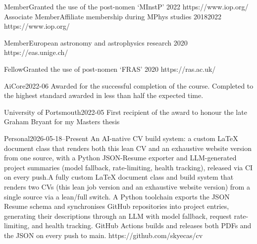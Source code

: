 {Member}{Granted the use of the post-nomen `MInstP'}
{2022}{}
{}
{https://www.iop.org/}
\iflean\else
{}
{Associate Member}{Affiliate membership during MPhys studies}
{2018}{2022}
{}
{https://www.iop.org/}

{Member}{European astronomy and astrophysics research}
{2020}{}
{}
{https://eas.unige.ch/}
\fi

{Fellow}{Granted the use of post-nomen `FRAS'}
{2020}{}
{}
{https://ras.ac.uk/}


{AiCore}{2022-06}
{Awarded for the successful completion of the course. Completed to the highest standard awarded in less than half the expected time.}

{University of Portsmouth}{2022-05}
{First recipient of the award to honour the late Graham Bryant for my Masters thesis}



{Personal}{2026-05-18--Present}
{\iflean An AI-native CV build system: a custom LaTeX document class that renders both this lean CV and an exhaustive website version from one source, with a Python JSON-Resume exporter and LLM-generated project summaries (model fallback, rate-limiting, health tracking), released via CI on every push.\else A fully custom LaTeX document class and build system that renders two CVs (this lean job version and an exhaustive website version) from a single source via a lean/full switch. A Python toolchain exports the JSON Resume schema and synchronises GitHub repositories into project entries, generating their descriptions through an LLM with model fallback, request rate-limiting, and health tracking. GitHub Actions builds and releases both PDFs and the JSON on every push to main.\fi}
{https://github.com/skyecas/cv}

